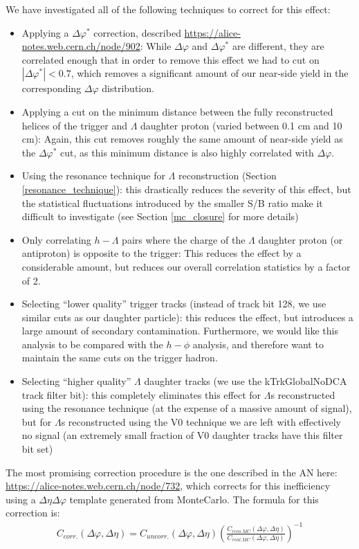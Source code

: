 \documentclass[ALICE,manyauthors]{ALICE_analysis_notes}
\begin{document}
We have investigated all of the following techniques to correct for this effect:
\begin{itemize}
\item Applying a $\Delta\varphi^{*}$ correction, described \href{here}{https://alice-notes.web.cern.ch/node/902}: While $\Delta\varphi$ and $\Delta\varphi^{*}$ are different, they are correlated enough that in order to remove this effect we had to cut on $|\Delta\varphi^{*}| < 0.7$, which removes a significant amount of our near-side yield in the corresponding $\Delta\varphi$ distribution.
\item Applying a cut on the minimum distance between the fully reconstructed helices of the trigger and $\Lambda$ daughter proton (varied between 0.1 cm and 10 cm): Again, this cut removes roughly the same amount of near-side yield as the $\Delta\varphi^{*}$ cut, as this minimum distance is also highly correlated with $\Delta\varphi$.
\item Using the resonance technique for $\Lambda$ reconstruction (Section \ref{resonance_technique}): this drastically reduces the severity of this effect, but the statistical fluctuations introduced by the smaller S/B ratio make it difficult to investigate (see Section \ref{mc_closure} for more details)
\item Only correlating $h-\Lambda$ pairs where the charge of the $\Lambda$ daughter proton (or antiproton) is opposite to the trigger: This reduces the effect by a considerable amount, but reduces our overall correlation statistics by a factor of 2.
\item Selecting ``lower quality'' trigger tracks (instead of track bit 128, we use similar cuts as our daughter particle): this reduces the effect, but introduces a large amount of secondary contamination. Furthermore, we would like this analysis to be compared with the $h-\phi$ analysis, and therefore want to maintain the same cuts on the trigger hadron.
\item Selecting ``higher quality''  $\Lambda$ daughter tracks (we use the kTrkGlobalNoDCA track filter bit): this completely eliminates this effect for $\Lambda$s reconstructed using the resonance technique (at the expense of a massive amount of signal), but for $\Lambda$s reconstructed using the V0 technique we are left with effectively no signal (an extremely small fraction of V0 daughter tracks have this filter bit set)
\end{itemize}

The most promising correction procedure is the one described in the AN here: \url{https://alice-notes.web.cern.ch/node/732}, which corrects for this inefficiency using a $\Delta\eta\Delta\varphi$ template generated from MonteCarlo. The formula for this correction is:
\begin{align*}
	C_{corr.}(\Delta\varphi, \Delta\eta) = C_{uncorr.}(\Delta\varphi, \Delta\eta)(\frac{C_{reco. MC}(\Delta\varphi, \Delta\eta)}{C_{real. MC}(\Delta\varphi, \Delta\eta)})^{-1}
\end{align*}
\end{document}
